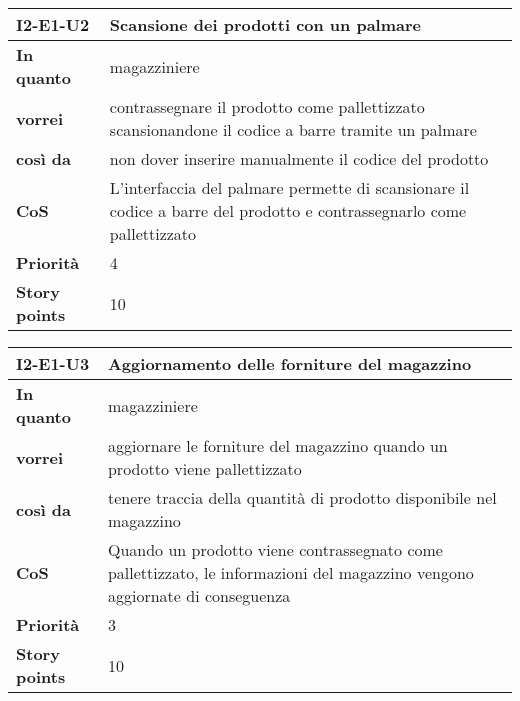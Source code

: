 \begin{table}[H]
  \begin{tabularx}{\textwidth}{lX}
    \toprule
    \textbf{I2-E1-U2} & \textbf{Scansione dei prodotti con un palmare} \\
    \midrule
    \textbf{In quanto} & magazziniere \\
    \textbf{vorrei} & contrassegnare il prodotto come pallettizzato scansionandone il codice a barre tramite un palmare \\
    \textbf{così da} & non dover inserire manualmente il codice del prodotto \\
    \midrule
    \textbf{CoS} & L'interfaccia del palmare permette di scansionare il codice a barre del prodotto e contrassegnarlo come pallettizzato \\
    \midrule
    \textbf{Priorità} & 4 \\
    \textbf{Story points} & 10 \\
    \bottomrule
  \end{tabularx}
  \label{user-story:i2-e1-u2}
\end{table}

\begin{table}[H]
  \begin{tabularx}{\textwidth}{lX}
    \toprule
    \textbf{I2-E1-U3} & \textbf{Aggiornamento delle forniture del magazzino} \\
    \midrule
    \textbf{In quanto} & magazziniere \\
    \textbf{vorrei} & aggiornare le forniture del magazzino quando un prodotto viene pallettizzato \\
    \textbf{così da} & tenere traccia della quantità di prodotto disponibile nel magazzino \\
    \midrule
    \textbf{CoS} & Quando un prodotto viene contrassegnato come pallettizzato, le informazioni del magazzino vengono aggiornate di conseguenza \\
    \midrule
    \textbf{Priorità} & 3 \\
    \textbf{Story points} & 10 \\
    \bottomrule
  \end{tabularx}
  \label{user-story:i2-e1-u3}
\end{table}

